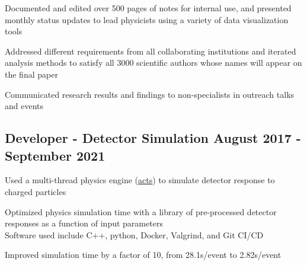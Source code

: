 \documentclass[letter,10pt]{article}
\begin{document}
\begin{zitemize}
\item Documented and edited over 500 pages of notes for internal use, and presented monthly status updates to lead physicists using a variety of data visualization tools
\item Addressed different requirements from all collaborating institutions and iterated analysis methods to satisfy all 3000 scientific authors whose names will appear on the final paper
\item Communicated research results and findings to non-specialists in outreach talks and events
\end{zitemize}
\subsection{{Developer - Detector Simulation  \hfill August 2017 - September 2021 }}
\begin{zitemize}
\item Used a multi-thread physics engine (\href{https://github.com/acts-project/acts/}{acts}) to simulate detector response to charged particles
\item Optimized physics simulation time with a library of pre-processed detector responses as a function of input parameters \\
Software used include C++, python, Docker, Valgrind, and Git CI/CD
\item Improved simulation time by a factor of 10, from 28.1s/event to 2.82s/event
\end{zitemize}

\end{document}
